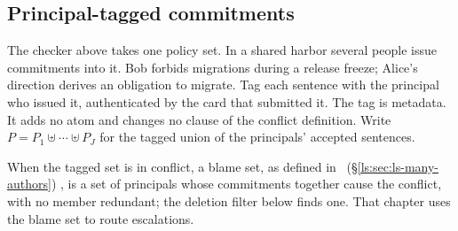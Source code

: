 
\subsection{Principal-tagged commitments}\label{sec:he-principal-commitments}

The checker above takes one policy set. In a shared harbor several people
issue commitments into it. Bob forbids migrations during a release freeze;
Alice's direction derives an obligation to migrate. Tag each sentence with the
principal who issued it, authenticated by the card that submitted it. The tag
is metadata. It adds no atom and changes no clause of the conflict definition.
Write $P=P_1\uplus\cdots\uplus P_J$ for the tagged union of the principals'
accepted sentences.

When the tagged set is in conflict, a blame set, as defined in
%
\ifpdbook
\ (\S\ref{ls:sec:ls-many-authors})%
\fi
, is a set of principals whose commitments together cause the conflict,
with no member redundant; the deletion filter below finds one. That chapter
uses the blame set to route escalations.

